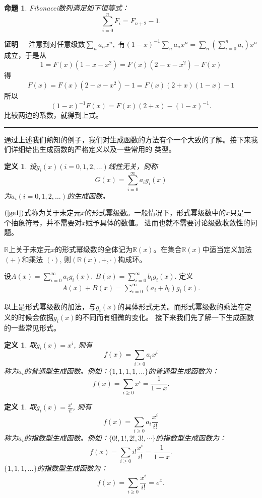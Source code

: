 \documentclass[a4paper,11pt,twoside]{book}
\newtheorem{prop}[thm]{命题}
\newtheorem{defi}[thm]{定义}
\def\qed{\nopagebreak\hfill{\rule{4pt}{7pt}}\medbreak}
\def\pf{{\bf 证明~~ }}
\begin{document}
\begin{prop}
Fibonacci数列满足如下恒等式：
$$\sum_{i=0}^nF_i=F_{n+2}-1.$$
\end{prop}
\pf 注意到对任意级数$\sum_{n}a_nx^n,$ 有$(1-x)^{-1}\sum_{n}a_nx^n=\sum_n(\sum_{i=0}^na_i)x^n$成立，于是从
$$1=F(x)(1-x-x^2)=F(x)(2-x-x^2)-F(x)$$
得
$$F(x)=F(x)(2-x-x^2)-1=F(x)(2+x)(1-x)-1$$
所以
$$(1-x)^{-1}F(x)=F(x)(2+x)-(1-x)^{-1}.$$
比较两边的系数，就得到上式。\qed

通过上述我们熟知的例子，我们对生成函数的方法有个一个大致的了解。接下来我们详细给出生成函数的严格定义以及一些常用的
类型。

\begin{defi}
设$g_i(x)(i=0,1,2,\ldots)$线性无关，则称
\begin{equation}\label{ge1}
G(x)=\sum_{i=0}^{\infty}a_ig_i(x)
\end{equation}
为$a_i(i=0,1,2,\ldots)$的生成函数。
\end{defi}


$(\ref{ge1})$式称为关于未定元$x$的形式幂级数。一般情况下，形式幂级数中的$x$只是一个抽象符号，并不需要对$x$赋予具体的数值。
进而也就不需要讨论级数收敛性的问题。

$\mathbb{R}$上关于未定元$x$的形式幂级数的全体记为$\mathbb{R}(x)$。在集合$\mathbb{R}(x)$中适当定义加法$(+)$和乘法
$(\cdot)$, 则$(\mathbb{R}(x),+,\cdot)$构成环。

设$A(x)=\sum_{i=0}^{\infty}a_ig_i(x),\ B(x)=\sum_{i=0}^{\infty}b_ig_i(x)$. 定义
\begin{eqnarray*}
A(x)+B(x)=\sum_{i=0}^{\infty}(a_i+b_i)g_i(x).
\end{eqnarray*}

以上是形式幂级数的加法，与$g_i(x)$的具体形式无关。而形式幂级数的乘法在定义的时候会依据$g_i(x)$的不同而有细微的变化。
接下来我们先了解一下生成函数的一些常见形式。

\begin{defi}
取$g_i(x)=x^i$, 则有
$$f(x)=\sum_{i\geq0}a_ix^i$$
称为$a_i$的普通型生成函数。例如：$\{1,1,1,1,\ldots\}$的普通型生成函数为：
$$f(x)=\sum_{i\ge0}x^i=\frac{1}{1-x}.$$
\end{defi}

\begin{defi}
取$g_i(x)=\frac{x^i}{i!}$, 则有
$$f(x)=\sum_{i\geq0}a_i\frac{x^i}{i!}$$
称为$a_i$的指数型生成函数。例如：$\{0!,1!,2!,3!,\cdots\}$的指数型生成函数为：
$$f(x)=\sum_{i\ge0}i!\frac{x^i}{i!}=\frac{1}{1-x}.$$
$\{1,1,1,\ldots\}$的指数型生成函数为：
$$f(x)=\sum_{i\ge0}\frac{x^i}{i!}=e^x.$$
\end{defi}
\end{document}
